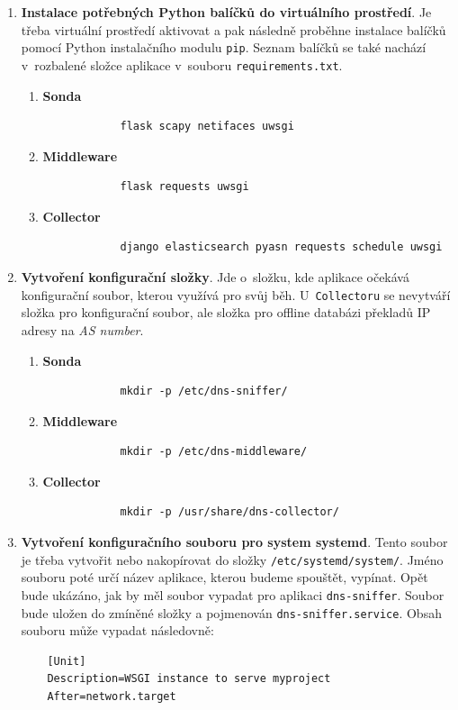 \documentclass[thesis=M,czech]{src/FITthesis}[2019/12/23]
\begin{document}
\begin{enumerate}
	\item \textbf{Instalace potřebných Python balíčků do virtuálního prostředí}. Je třeba virtuální prostředí aktivovat a pak následně proběhne instalace balíčků pomocí Python instalačního modulu \texttt{pip}. Seznam balíčků se také nachází v~rozbalené složce aplikace v~souboru \texttt{requirements.txt}.
	\begin{enumerate}
			\item \textbf{Sonda}
			\begin{verbatim}
			flask scapy netifaces uwsgi 
			\end{verbatim}
			\item \textbf{Middleware}
			\begin{verbatim}
			flask requests uwsgi
			\end{verbatim}
			\item \textbf{Collector}
			\begin{verbatim}
			django elasticsearch pyasn requests schedule uwsgi
			\end{verbatim}
	\end{enumerate}
	
	\item \textbf{Vytvoření konfigurační složky}. Jde o~složku, kde aplikace očekává konfigurační soubor, kterou využívá pro svůj běh. U~\texttt{Collectoru} se nevytváří složka pro konfigurační soubor, ale složka pro offline databázi překladů IP adresy na \textit{AS number}.
	\begin{enumerate}
			\item \textbf{Sonda}
			\begin{verbatim}
			mkdir -p /etc/dns-sniffer/
			\end{verbatim}
			\item \textbf{Middleware}
			\begin{verbatim}
			mkdir -p /etc/dns-middleware/
			\end{verbatim}
			\item \textbf{Collector}
			\begin{verbatim}
			mkdir -p /usr/share/dns-collector/
			\end{verbatim}
	\end{enumerate}
	
	\item \textbf{Vytvoření konfiguračního souboru pro system systemd}. Tento soubor je třeba vytvořit nebo nakopírovat do složky \texttt{/etc/systemd/system/}. Jméno souboru poté určí název aplikace, kterou budeme spouštět, vypínat. Opět bude ukázáno, jak by měl soubor vypadat pro aplikaci \texttt{dns-sniffer}. Soubor bude uložen do zmíněné složky a pojmenován \texttt{dns-sniffer.service}. Obsah souboru může vypadat následovně:
	\begin{verbatim}
	[Unit]
	Description=WSGI instance to serve myproject
	After=network.target


\end{verbatim}
\end{enumerate}
\end{document}
